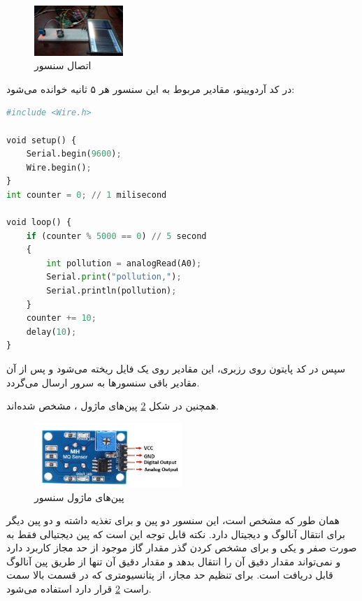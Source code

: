 \begin{figure}[ht!]
	\centering
	\includegraphics[width=0.3\textwidth]{figs/dhtmq2.jpg}
	
	\caption{اتصال سنسور }
	\label{fig:3}
\end{figure}


در کد آردویینو، مقادیر مربوط به این سنسور هر ۵ ثانیه خوانده می‌شود:
\begin{latin}
	\begin{lstlisting}[language=python]
#include <Wire.h>

void setup() {
	Serial.begin(9600);
	Wire.begin();
}
int counter = 0; // 1 milisecond

void loop() {	
	if (counter % 5000 == 0) // 5 second
	{
		int pollution = analogRead(A0);
		Serial.print("pollution,");
		Serial.println(pollution);
	} 
	counter += 10;
	delay(10);
}
	\end{lstlisting}
\end{latin}

سپس در کد پایتون روی رزبری، این مقادیر روی یک فایل ریخته می‌شود و پس از آن  مقادیر باقی سنسورها به سرور ارسال می‌گردد.


همچنین در شکل \ref{fig:14} پین‌های ماژول ، مشخص شده‌اند.

\begin{figure}[h]
	\centering
	\includegraphics[width=0.5\textwidth]{figs/mq135.jpg}
	
	\caption{پین‌های ماژول سنسور }
	\label{fig:14}
\end{figure}

همان طور که مشخص است، این سنسور دو پین  و  برای تغذیه داشته و دو پین دیگر برای انتقال آنالوگ و دیجیتال دارد. نکته قابل توجه این است که پین دیجتیالی فقط به صورت صفر و یکی و برای مشخص کردن گذر مقدار گاز موجود از حد مجاز کاربرد دارد و نمی‌تواند مقدار دقیق آن را انتقال بدهد و مقدار دقیق آن تنها از طریق پین آنالوگ قابل دریافت است. برای تنظیم حد مجاز، از پتانسیومتری که در قسمت بالا سمت راست \ref{fig:14} قرار دارد استفاده می‌شود.



